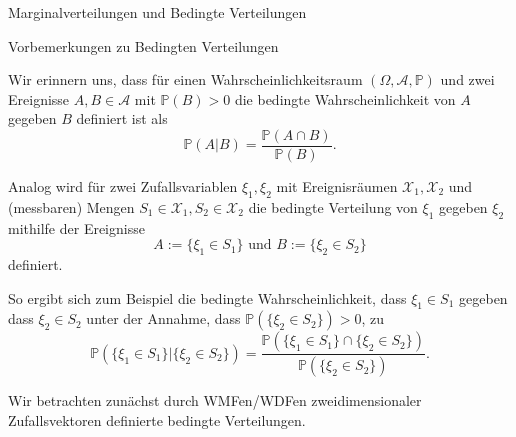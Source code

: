 \documentclass[
  8pt,
  ignorenonframetext,
]{beamer}
\begin{document}
\begin{frame}{Marginalverteilungen und Bedingte Verteilungen}
\protect\hypertarget{marginalverteilungen-und-bedingte-verteilungen-3}{}
\small

Vorbemerkungen zu Bedingten Verteilungen

\footnotesize

Wir erinnern uns, dass für einen Wahrscheinlichkeitsraum
\((\Omega, \mathcal{A}, \mathbb{P})\) und zwei Ereignisse
\(A,B \in \mathcal{A}\) mit \(\mathbb{P}(B) > 0\) die bedingte
Wahrscheinlichkeit von \(A\) gegeben \(B\) definiert ist als
\begin{equation}
\mathbb{P}(A|B) = \frac{\mathbb{P}(A \cap B)}{\mathbb{P}(B)}.
\end{equation}

Analog wird für zwei Zufallsvariablen \(\xi_1,\xi_2\) mit Ereignisräumen
\(\mathcal{X}_1,\mathcal{X}_2\) und (messbaren) Mengen
\(S_1 \in \mathcal{X}_1, S_2 \in \mathcal{X}_2\) die bedingte Verteilung
von \(\xi_1\) gegeben \(\xi_2\) mithilfe der Ereignisse \begin{equation}
A := \{\xi_1 \in S_1\} \mbox{ und } B := \{\xi_2 \in S_2\}
\end{equation} definiert. \vspace{1mm}

So ergibt sich zum Beispiel die bedingte Wahrscheinlichkeit, dass
\(\xi_1 \in S_1\) gegeben dass \(\xi_2 \in S_2\) unter der Annahme, dass
\(\mathbb{P}(\{\xi_2 \in S_2\}) > 0\), zu \begin{equation}
\mathbb{P}( \{\xi_1 \in S_1\}|\{\xi_2 \in S_2\})
= \frac{\mathbb{P}(\{\xi_1 \in S_1\} \cap \{\xi_2 \in S_2\})}{\mathbb{P}(\{\xi_2 \in S_2\})}.
\end{equation}

Wir betrachten zunächst durch WMFen/WDFen zweidimensionaler
Zufallsvektoren definierte bedingte Verteilungen.
\end{frame}
\end{document}
